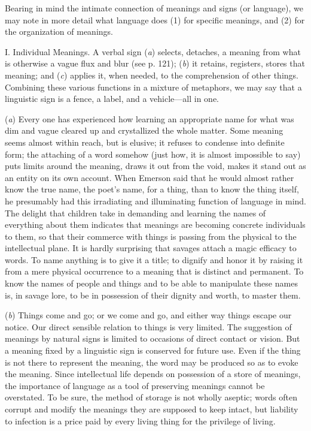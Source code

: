 \documentclass[letterpaper]{book}
\begin{document}
Bearing in mind the intimate connection of meanings and signs (or
language), we may note in more detail what language does (1) for
specific meanings, and (2) for the organization of meanings.

I. Individual Meanings. A verbal sign (\emph{a}) selects, detaches, a
meaning from what is otherwise a vague flux and blur (see p. 121);
(\emph{b}) it retains, registers, stores that meaning; and (\emph{c})
applies it, when needed, to the comprehension of other things. Combining
these various functions in a mixture of metaphors, we may say that a
linguistic sign is a fence, a label, and a vehicle---all in one.


(\emph{a}) Every one has experienced how learning an appropriate name
for what was dim and vague cleared up and crystallized the whole matter.
Some meaning seems almost within reach, but is elusive; it refuses to
condense into definite form; the attaching of a word somehow (just how,
it is almost impossible to say) puts limits around the meaning, draws it
out from the void, makes it stand out as an entity on its own account.
When Emerson said that he would almost rather know the true name, the
poet's name, for a thing, than to know the thing itself, he presumably
had this irradiating and illuminating function of language in mind. The
delight that children take in demanding and learning the names of
everything about them indicates that meanings are becoming concrete
individuals to them, so that their commerce with things is passing from
the physical to the intellectual plane. It is hardly surprising that
savages attach a magic efficacy to words. To name anything is to give it
a title; to dignify and honor it
by
raising it from a mere physical occurrence to a meaning that is distinct
and permanent. To know the names of people and things and to be able to
manipulate these names is, in savage lore, to be in possession of their
dignity and worth, to master them.


(\emph{b}) Things come and go; or we come and go, and either way things
escape our notice. Our direct sensible relation to things is very
limited. The suggestion of meanings by natural signs is limited to
occasions of direct contact or vision. But a meaning fixed by a
linguistic sign is conserved for future use. Even if the thing is not
there to represent the meaning, the word may be produced so as to evoke
the meaning. Since intellectual life depends on possession of a store of
meanings, the importance of language as a tool of preserving meanings
cannot be overstated. To be sure, the method of storage is not wholly
aseptic; words often corrupt and modify the meanings they are supposed
to keep intact, but liability to infection is a price paid by every
living thing for the privilege of living.
\end{document}
